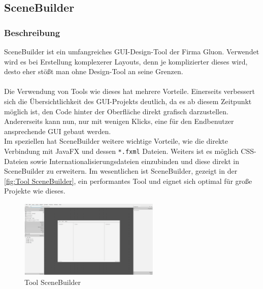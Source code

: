 \subsection{SceneBuilder}\label{subsec:scenebuilder}
\subsubsection{Beschreibung}
SceneBuilder ist ein umfangreiches GUI-Design-Tool der Firma Gluon.
Verwendet wird es bei Erstellung komplexerer Layouts, denn je komplizierter dieses wird, desto eher stößt man ohne Design-Tool an seine Grenzen.\\\\
Die Verwendung von Tools wie dieses hat mehrere Vorteile.
Einerseits verbessert sich die Übersichtlichkeit des GUI-Projekts deutlich, da es ab diesem Zeitpunkt möglich ist, den Code hinter der Oberfläche direkt grafisch darzustellen.
Andererseits kann nun, nur mit wenigen Klicks, eine für den Endbenutzer ansprechende GUI gebaut werden.\\
Im speziellen hat SceneBuilder weitere wichtige Vorteile, wie die direkte Verbindung mit JavaFX und dessen \lstinline{*.fxml} Dateien.
Weiters ist es möglich CSS-Dateien sowie Internationalisierungsdateien einzubinden und diese direkt in SceneBuilder zu erweitern.
Im wesentlichen ist SceneBuilder, gezeigt in der \autoref{fig:Tool SceneBuilder}, ein performantes Tool und eignet sich optimal für große Projekte wie dieses.
\begin{figure}[H]
    \centering
    \includegraphics[width=0.6\textwidth]{fig/ainf/SceneBuilder.png}
    \caption{Tool SceneBuilder}
    \label{fig:Tool SceneBuilder}
\end{figure}
